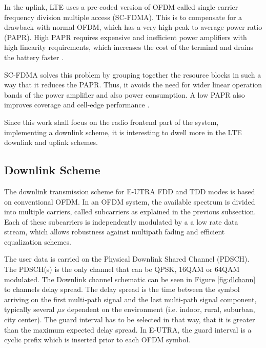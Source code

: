
In the uplink, LTE uses a pre-coded version of OFDM called single carrier
frequency division multiple access (SC-FDMA). This is to compensate for a
drawback with normal OFDM, which has a very high peak to average power ratio
(PAPR). High PAPR requires expensive and inefficient power amplifiers with high
linearity requirements, which increases the cost of the terminal and drains the
battery faster \cite{introlte} \cite{umtslte}.

SC-FDMA solves this problem by grouping together the resource blocks in such a
way that it reduces the PAPR. Thus, it avoids the need for wider linear
operation bands of the power amplifier and also power consumption. A low PAPR
also improves coverage and cell-edge performance \cite{introlte}.

Since this work shall focus on the radio frontend part of the system, implementing
a downlink scheme, it is interesting to dwell more in the LTE downlink and uplink
schemes.

\subsection{Downlink Scheme}%

The downlink transmission scheme for E-UTRA FDD and TDD modes is based on
conventional OFDM. In an OFDM system, the available spectrum is divided into
multiple carriers, called subcarriers as explained in the previous subsection.
Each of these subcarriers is independently modulated by a a low rate data
stream, which allows robustness against multipath fading and efficient
equalization schemes.

The user data is carried on the Physical Downlink Shared Channel (PDSCH). The
PDSCH(s) is the only channel that can be QPSK, 16QAM or 64QAM modulated. The
Downlink channel schematic can be seen in Figure \ref{fig:dlchann} to channels
delay spread. The delay spread is the time between the symbol arriving on the
first multi-path signal and the last multi-path signal component, typically
several $\mu s$ dependent on the environment (i.e. indoor, rural, suburban, city
center). The guard interval has to be selected in that way, that it is greater
than the maximum expected delay spread. In E-UTRA, the guard interval is a
cyclic prefix which is inserted prior to each OFDM symbol.

